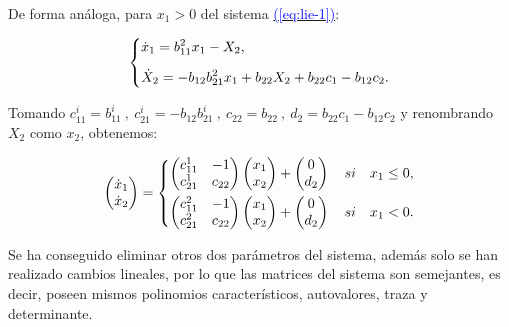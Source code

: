 \documentclass[12pt,a4paper]{report} %
\newcommand{\eref}[1]{\hyperref[#1]{\textcolor{blue}{(\ref*{#1})}}}
\begin{document}
	\noindent De forma análoga, para $x_1>0$ del sistema \eref{eq:lie-1}:
	
	\begin{equation}
		\label{eq:q2}
		\scalebox{1}{$\displaystyle
			\left\{
			\begin{aligned}
			&\dot{x}_1=b_{11}^2x_1-X_2, \\[2mm]
			&\dot{X}_2=-b_{12}b_{21}^2x_1+b_{22}X_2+b_{22}c_1-b_{12}c_2.
		\end{aligned}
		\right.
		$}
	\end{equation}\smallskip
	
	\noindent Tomando $c_{11}^i=b_{11}^i \: , \: c_{21}^i=-b_{12}b_{21}^i \: , \: c_{22}=b_{22} \: , \: d_2=b_{22}c_1-b_{12}c_2$ y renombrando $X_2$ como $x_2$, obtenemos:
	
	\begin{equation}
		\begin{pmatrix*}[r]
			\dot{x}_1 \\ \dot{x}_2
		\end{pmatrix*}=
		\label{eq:lie-12}
		\scalebox{1}{$\displaystyle
			\left\{
			\begin{aligned}
				\begin{pmatrix*}[r]
					c_{11}^1 & -1 \\
					c_{21}^1 & c_{22}
				\end{pmatrix*}\begin{pmatrix*}[r]
				x_1\\x_2
				\end{pmatrix*}+\begin{pmatrix*}[c]
				0 \\ d_2
				\end{pmatrix*} \quad si \quad x_1 \leq 0, \\
				\begin{pmatrix*}[r]
					c_{11}^2 & -1 \\
					c_{21}^2 & c_{22}
				\end{pmatrix*}\begin{pmatrix*}[r]
				x_1\\x_2
				\end{pmatrix*}+\begin{pmatrix*}[c]
				0 \\ d_2
				\end{pmatrix*} \quad si \quad x_1 < 0.
			\end{aligned}
			\right.
			$} 
	\end{equation}\smallskip
	
	\noindent Se ha conseguido eliminar otros dos parámetros del sistema, además solo se han realizado cambios lineales, por lo que las matrices del sistema son semejantes, es decir, poseen mismos polinomios característicos, autovalores, traza y determinante.
	
\end{document}
